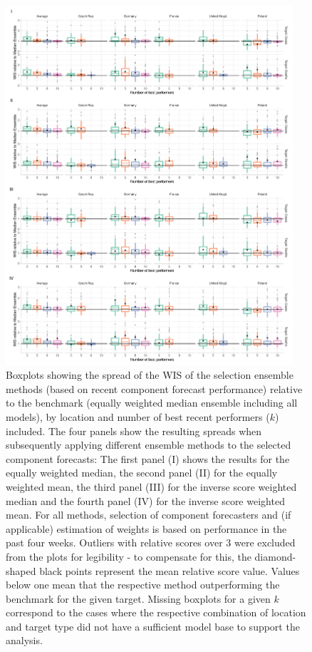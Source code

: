 \begin{figure}
\centering
\includegraphics[width = 0.95\textwidth]{../plots/best_performers_boxplot}
\caption{\footnotesize{Boxplots showing the spread of the WIS of the selection ensemble methods (based on recent component forecast performance) relative to the benchmark (equally weighted median ensemble including all models), by location and number of best recent performers ($k$) included. The four panels show the resulting spreads when subsequently applying different ensemble methods to the selected component forecasts: The first panel (I) shows the results for the equally weighted median, the second panel (II) for the equally weighted mean, the third panel (III) for the inverse score weighted median and the fourth panel (IV) for the inverse score weighted mean. For all methods, selection of component forecasters and (if applicable) estimation of weights is based on performance in the past four weeks. Outliers with relative scores over 3 were excluded from the plots for legibility - to compensate for this, the diamond-shaped black points represent the mean relative score value. Values below one mean that the respective method outperforming the benchmark for the given target. Missing boxplots for a given $k$ correspond to the cases where the respective combination of location and target type did not have a sufficient model base to support the analysis.}}
\label{ref:best_perform_boxplot}
\end{figure}\\

